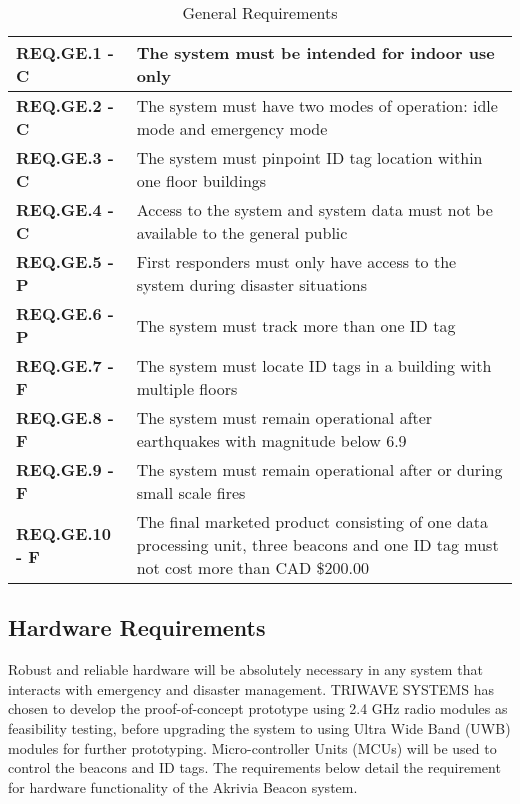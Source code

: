 \bgroup
\def\arraystretch{1.5}
\begin{table}[H]
\centering
\begin{tabular}{ | m{3.25cm} | m{12.5cm} |}
 \hline
 \textbf{REQ.GE.1 - C} & The system must be intended for indoor use only \\
\hline
 \textbf{REQ.GE.2 - C} & The system must have two modes of operation: idle mode and emergency mode \\
\hline
 \textbf{REQ.GE.3 - C} & The system must pinpoint ID tag location within one floor buildings \\
\hline
 \textbf{REQ.GE.4 - C} & Access to the system and system data must not be available to the general public \\
\hline
 \textbf{REQ.GE.5 - P} & First responders must only have access to the system during disaster situations \\
\hline
 \textbf{REQ.GE.6 - P} & The system must track more than one ID tag \\
\hline
 \textbf{REQ.GE.7 - F} & The system must locate ID tags in a building with multiple floors \\
\hline
 \textbf{REQ.GE.8 - F} & The system must remain operational after earthquakes with magnitude below 6.9 \\
\hline
 \textbf{REQ.GE.9 - F} & The system must remain operational after or during small scale fires \\
\hline
 \textbf{REQ.GE.10 - F} & The final marketed product consisting of one data processing unit, three beacons and one ID tag must not cost more than CAD \$200.00 \\
\hline
\end{tabular}
\caption{General Requirements}
\end{table}

\break
\subsection{Hardware Requirements}
Robust and reliable hardware will be absolutely necessary in any system that interacts with emergency and disaster management. TRIWAVE SYSTEMS has chosen to develop the proof-of-concept prototype using 2.4 GHz radio modules as feasibility testing, before upgrading the system to using Ultra Wide Band (UWB) modules for further prototyping. Micro-controller Units (MCUs) will be used to control the beacons and ID tags. The requirements below detail the requirement for hardware functionality of the Akrivia Beacon system.

